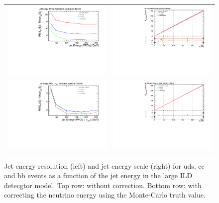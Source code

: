 %
% 
\begin{figure}[b!]
\begin{tabular}{cc}
\includegraphics[width=0.5\hsize]{Performance/fig/Jet_Energy_Resolution_Barrel_rel_pfo_without_nu.pdf} &
\includegraphics[width=0.5\hsize]{Performance/fig/Jet_Energy_Scale_Barrel_rel_pfo_without_nu.pdf}    \\
\includegraphics[width=0.5\hsize]{Performance/fig/Jet_Energy_Resolution_Barrel_rel_pfo_with_nu.pdf} &
\includegraphics[width=0.5\hsize]{Performance/fig/Jet_Energy_Scale_Barrel_rel_pfo_with_nu.pdf}   
\end{tabular}
\caption{\label{fig:perf:trkeff_jer_ccbb} Jet energy resolution (left) and jet energy scale (right) for uds, cc and bb events as a function of the jet
  energy in the large ILD detecgtor model. Top row: without correction. Bottom row: with correcting the neutrino energy using the Monte-Carlo truth value. }
 \end{figure}


